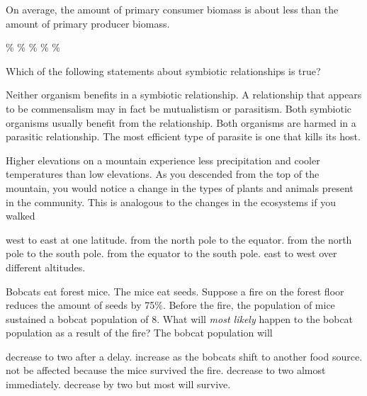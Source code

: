 \question
On average, the amount of primary consumer biomass is about \underline{\hspace{2cm}} less than the amount of primary producer biomass.

\begin{choices}
\%
\%
\%
\%
\%
\end{choices}

\newpage

\question
Which of the following statements about symbiotic relationships is true?

\begin{choices}
\choice Neither organism benefits in a symbiotic relationship.
\correctchoice A relationship that appears to be commensalism may in fact be mutualistism or parasitism.
\choice Both symbiotic organisms usually benefit from the relationship.
\choice Both organisms are harmed in a parasitic relationship.
\choice The most efficient type of parasite is one that kills its host.
\end{choices}

\question
Higher elevations on a mountain experience less precipitation and cooler temperatures than low elevations.  As you descended from the top of the mountain, you would notice a change in the types of plants and animals present in the community.  This is analogous to the changes in the ecosystems if you walked 

\begin{choices}
\choice west to east at one latitude.
\correctchoice from the north pole to the equator.
\choice from the north pole to the south pole.
\choice from the equator to the south pole.
\choice east to west over different altitudes.
\end{choices}

\question
Bobcats eat forest mice. The mice eat seeds. Suppose a fire on the forest floor reduces the amount of seeds by 75\%.  Before the fire, the population of mice sustained a bobcat population of 8. What will \emph{most likely} happen to the bobcat population as a result of the fire? The bobcat population will

\begin{choices}
\correctchoice decrease to two after a delay. 
\choice increase as the bobcats shift to another food source. 
\choice not be affected because the mice survived the fire. 
\choice decrease to two almost immediately. 
\choice decrease by two but most will survive. 
\end{choices}

